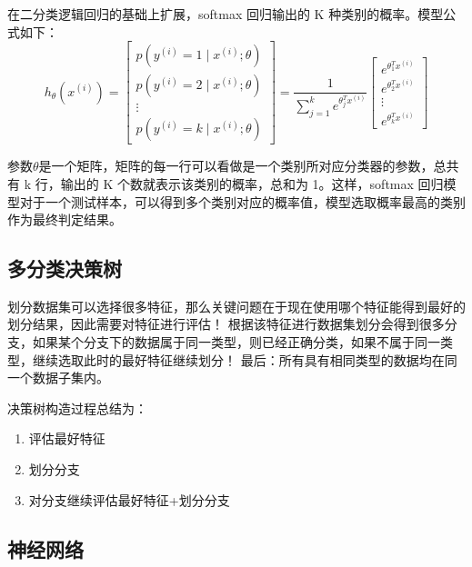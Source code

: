 \documentclass[UTF8,a4paper,AutoFakeBold,AutoFakeSlant]{article}
\begin{document}
在二分类逻辑回归的基础上扩展，softmax 回归输出的 K 种类别的概率。模型公式如下：
\begin{equation*}
  h_{\theta}\left(x^{(i)}\right)=\left[\begin{array}{c}
    p\left(y^{(i)}=1 \mid x^{(i)} ; \theta\right) \\
    p\left(y^{(i)}=2 \mid x^{(i)} ; \theta\right) \\
    \vdots \\
    p\left(y^{(i)}=k \mid x^{(i)} ; \theta\right)
    \end{array}\right]=\frac{1}{\sum_{j=1}^{k} e^{\theta_{j}^{T} x^{(i)}}}\left[\begin{array}{c}
    e^{\theta_{1}^{T} x^{(i)}} \\
    e^{\theta_{2}^{T} x^{(i)}} \\
    \vdots \\
    e^{\theta_{k}^{T} x^{(i)}}
    \end{array}\right]
\end{equation*}

参数$\theta$是一个矩阵，矩阵的每一行可以看做是一个类别所对应分类器的参数，总共有 k 行，输出的 K 个数就表示该类别的概率，总和为 1。这样，softmax 回归模型对于一个测试样本，可以得到多个类别对应的概率值，模型选取概率最高的类别作为最终判定结果。



\subsection{多分类决策树}

划分数据集可以选择很多特征，那么关键问题在于现在使用哪个特征能得到最好的划分结果，因此需要对特征进行评估！
根据该特征进行数据集划分会得到很多分支，如果某个分支下的数据属于同一类型，则已经正确分类，如果不属于同一类型，继续选取此时的最好特征继续划分！
最后：所有具有相同类型的数据均在同一个数据子集内。

决策树构造过程总结为：
\begin{enumerate}
  \item 评估最好特征
  \item 划分分支
  \item 对分支继续评估最好特征+划分分支
\end{enumerate}



\subsection{神经网络}
\end{document}
